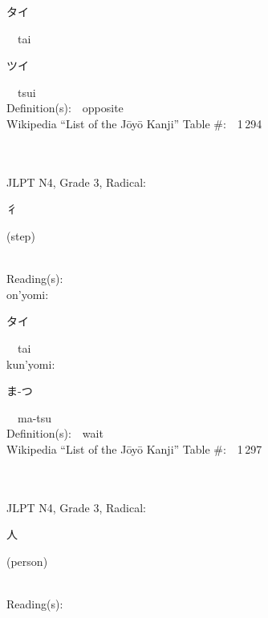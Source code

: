 \begin{multicols}{2}
{\hspace*{2em}}{\begin{CJK}{UTF8}{min} タイ \end{CJK}}\ \ tai\ \ \\
{\hspace*{2em}}{\begin{CJK}{UTF8}{min} ツイ \end{CJK}}\ \ tsui\ \ \\
Definition(s):\ \ opposite \\
Wikipedia ``List of the J\=oy\=o Kanji'' Table \#:\ \ 1\,294 \\
\ \ \\
{\fontsize{34pt}{40pt}  }\ \ \\  %
{JLPT N4, Grade 3, Radical:\ \ {\begin{CJK}{UTF8}{min} 彳 \end{CJK}} (step) } \\
Reading(s):\ \ \\
{\hspace*{1em}}on'yomi:\ \ \\
{\hspace*{2em}}{\begin{CJK}{UTF8}{min} タイ \end{CJK}}\ \ tai\ \ \\
{\hspace*{1em}}kun'yomi:\ \ \\
{\hspace*{2em}}{\begin{CJK}{UTF8}{min} ま-つ \end{CJK}}\ \ ma-tsu\ \ \\
Definition(s):\ \ wait \\
Wikipedia ``List of the J\=oy\=o Kanji'' Table \#:\ \ 1\,297 \\
\ \ \\
{\fontsize{34pt}{40pt}  }\ \ \\  %
{JLPT N4, Grade 3, Radical:\ \ {\begin{CJK}{UTF8}{min} 人 \end{CJK}} (person) } \\
Reading(s):\ \ \\

\end{multicols}
